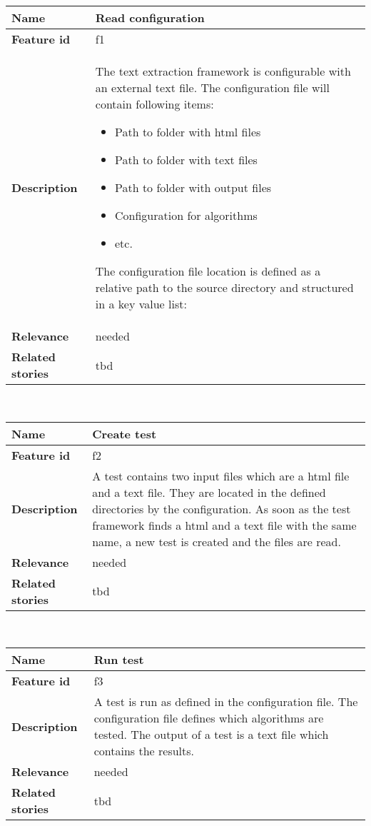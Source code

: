 	\begin{tabular}{ | p{3cm} | p{12cm} |}
	\hline
	\textbf{Name} 				& Read configuration 				\\ \hline
	\textbf{Feature id} 		& f1 				\\ \hline
	\textbf{Description} 		& The text extraction framework is configurable with an external text file. The configuration file will contain following items:
							        \begin{itemize}
							        \item Path to folder with html files
							        \item Path to folder with text files
							        \item Path to folder with output files
							        \item Configuration for algorithms
							        \item etc.
						        \end{itemize} 
						        The configuration file location is defined as a relative path to the source directory and structured in a key value list: 

						         \\ \hline
	\textbf{Relevance} 			& needed 			\\ \hline
	\textbf{Related stories} 	& tbd		\\ \hline
	\end{tabular} \\

	\begin{tabular}{ | p{3cm} | p{12cm} |}
	\hline
	\textbf{Name} 				& Create test \\ \hline
	\textbf{Feature id} 		& f2 \\ \hline
	\textbf{Description} 		& A test contains two input files which are a html file and a text file. They are located in the defined directories by the configuration. As soon as the test framework finds a html and a text file with the same name, a new test is created and the files are read.\\ \hline
	\textbf{Relevance} 			& needed \\ \hline
	\textbf{Related stories} 	& tbd \\ \hline
	\end{tabular} \\

	\begin{tabular}{ | p{3cm} | p{12cm} |}
	\hline
	\textbf{Name} 				& Run test \\ \hline
	\textbf{Feature id} 		& f3 \\ \hline
	\textbf{Description} 		& A test is run as defined in the configuration file. The configuration file defines which algorithms are tested. The output of a test is a text file which contains the results. \\ \hline
	\textbf{Relevance} 			& needed \\ \hline
	\textbf{Related stories} 	& tbd \\ \hline
	\end{tabular} \\

